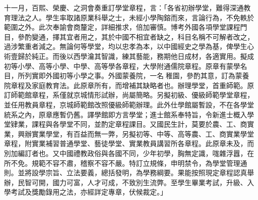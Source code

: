\begin{pinyinscope}
十一月，百熙、榮慶、之洞會奏重訂學堂章程，言：「各省初辦學堂，難得深通教育理法之人。學生率取諸原業科舉之士，未經小學陶鎔而來，言論行為，不免軼於範圍之外。此次奉諭會商釐定，詳細推求，倍加審慎。博考外國各項學堂課程門目，參酌變通，擇其宜者用之，其於中國不相宜者缺之，科目名稱不可解者改之，過涉繁重者減之。無論何等學堂，均以忠孝為本，以中國經史之學為基，俾學生心術壹歸於純正。而後以西學瀹其智識，練其藝能，務期他日成材，各適實用。擬成初等小學、高等小學、中學、高等學各章程，大學附通儒院章程。原章有蒙學名目，所列實即外國初等小學之事。外國蒙養院，一名稚園，參酌其意，訂為蒙養院章程及家庭教育法。此原章所有，而增補其缺略者也。辦理學堂，首重師範。原訂師範館章程，系僅就京城情形試辦，尚屬簡略。另擬初級、優級師範學堂章程，並任用教員章程，京城師範館改照優級師範辦理。此外仕學館屬暫設，不在各學堂統系之內，原章應暫仍舊。譯學館即方言學堂；進士館系奉特旨，令新進士概入學堂肄業，課程與各學堂不同，並酌定章程課目。又國民生計，莫要於農、工、商實業，興辦實業學堂，有百益而無一弊，另擬初等、中等、高等農、工、商實業學堂章程，附實業補習普通學堂、藝徒學堂、實業教員講習所各章程。此原章未及，而別加編訂者也。又中國禮教政俗與各國不同，少年初學，胸無定識，哤雜浮囂，在所不免。規範不容不肅，稽察不容不嚴。特訂立規條，申明禁令，為學堂管理通則。並將設學宗旨、立法要義，總括發明，為學務綱要。果能按照現定章程認真舉辦，民智可開，國力可富，人才可成，不致別生流弊。至學生畢業考試，升級、入學考試及獎勵錄用之法，亦經詳定專章，伏候裁定。」


\end{pinyinscope}
